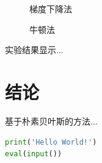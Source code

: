 \documentclass{sdureport}
\begin{document}
\begin{sduDocument}
	\begin{figure}[H]
		\caption{梯度下降法}
	\end{figure}
	\begin{figure}[H]
		\caption{牛顿法}
	\end{figure}
	
	实验结果显示...
	
	\section{结论}
	
	基于朴素贝叶斯的方法...
	

\end{sduDocument}

\begin{lstlisting}[language=python]
print('Hello World!')
eval(input())
\end{lstlisting}
\end{document}
